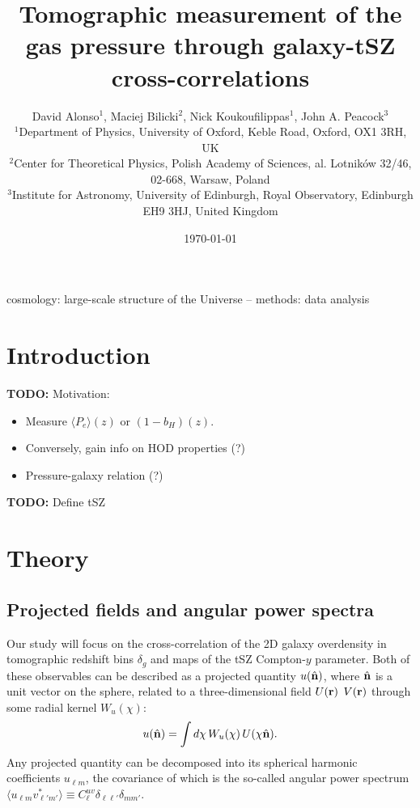 \documentclass[useAMS,usenatbib]{mn2e}
\title[Tomographic measurement of the gas pressure through galaxy-tSZ cross-correlations]{Tomographic measurement of the gas pressure through galaxy-tSZ cross-correlations}
\author[David Alonso]{David Alonso$^1$, Maciej Bilicki$^2$, Nick Koukoufilippas$^1$, John A. Peacock$^3$\\
                      $^{1}$Department of Physics, University of Oxford, Keble Road, Oxford, OX1 3RH, UK\\
                      $^{2}$Center for Theoretical Physics, Polish Academy of Sciences, al. Lotnik\'ow 32/46, 02-668, Warsaw, Poland\\
                      $^{3}$Institute for Astronomy, University of Edinburgh, Royal Observatory, Edinburgh EH9 3HJ, United Kingdom
                      }
\newcommand{\nv}{\hat{\bf n}}
\newcommand{\TODO}[1]{{\bf TODO:} #1}
\begin{document}
  \date{\today}
   
  \maketitle

\begin{abstract}
  \lipsum[1]
\end{abstract}

\begin{keywords}
  cosmology: large-scale structure of the Universe -- methods: data analysis
\end{keywords}

\section{Introduction}\label{sec:intro}
  \TODO{Motivation:}
  \begin{itemize}
    \item Measure $\langle P_e\rangle(z)$ or $(1-b_H)(z)$.
    \item Conversely, gain info on HOD properties (?)
    \item Pressure-galaxy relation (?)
  \end{itemize}
  \TODO{Define tSZ}

\section{Theory}\label{sec:theory}
  \subsection{Projected fields and angular power spectra}\label{ssec:theory.cls}
    Our study will focus on the cross-correlation of the 2D galaxy overdensity in tomographic redshift bins $\delta_g$ and maps of the tSZ Compton-$y$ parameter. Both of these observables can be described as a projected quantity $u(\nv)$, where $\nv$ is a unit vector on the sphere, related to a three-dimensional field $U({\bf r})$ $V({\bf r})$ through some radial kernel $W_u(\chi)$:
    \begin{equation}
      u(\nv)=\int d\chi\,W_u(\chi)\,U(\chi\nv).
    \end{equation}
    Any projected quantity can be decomposed into its spherical harmonic coefficients $u_{\ell m}$, the covariance of which is the so-called angular power spectrum $\langle u_{\ell m}v^*_{\ell' m'}\rangle\equiv C^{uv}_\ell\delta_{\ell\ell'}\delta_{mm'}$.
\end{document}
